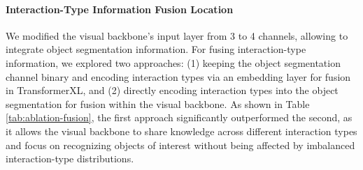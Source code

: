 
\paragraph{Interaction-Type Information Fusion Location} We modified the visual backbone’s input layer from 3 to 4 channels, allowing \agent to integrate object segmentation information. For fusing interaction-type information, we explored two approaches: (1) keeping the object segmentation channel binary and encoding interaction types via an embedding layer for fusion in TransformerXL, and (2) directly encoding interaction types into the object segmentation for fusion within the visual backbone. As shown in Table \ref{tab:ablation-fusion}, the first approach significantly outperformed the second, as it allows the visual backbone to share knowledge across different interaction types and focus on recognizing objects of interest without being affected by imbalanced interaction-type distributions. 




